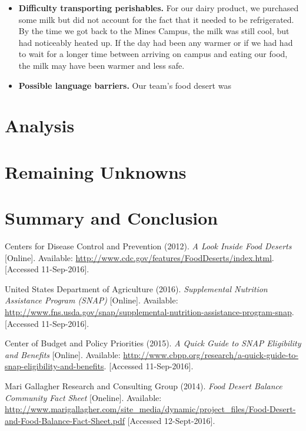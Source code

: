 \documentclass[11pt]{article}
\begin{document}
\begin{itemize}
    \item \textbf{Difficulty transporting perishables.} For our dairy product, we purchased some
        milk but did not account for the fact that it needed to be refrigerated. By the time we got
        back to the Mines Campus, the milk was still cool, but had noticeably heated up. If the day
        had been any warmer or if we had had to wait for a longer time between arriving on campus
        and eating our food, the milk may have been warmer and less safe.

    \item \textbf{Possible language barriers.} Our team's food desert was 

\end{itemize}

\section{Analysis}

\section{Remaining Unknowns}

\section{Summary and Conclusion}

\pagebreak
\begin{thebibliography}{9}
    Centers for Disease Control and Prevention (2012).
    \textit{A Look Inside Food Deserts} [Online].
    Available: \url{http://www.cdc.gov/features/FoodDeserts/index.html}.
    [Accessed 11-Sep-2016].

    United States Department of Agriculture (2016).
    \textit{Supplemental Nutrition Assistance Program (SNAP)} [Online].
    Available: \url{http://www.fns.usda.gov/snap/supplemental-nutrition-assistance-program-snap}.
    [Accessed 11-Sep-2016].

    Center of Budget and Policy Priorities (2015).
    \textit{A Quick Guide to SNAP Eligibility and Benefits} [Online].
    Available: \url{http://www.cbpp.org/research/a-quick-guide-to-snap-eligibility-and-benefits}.
    [Accessed 11-Sep-2016].

    Mari Gallagher Research and Consulting Group (2014).
    \textit{Food Desert Balance Community Fact Sheet} [Oneline].
    Available:
    \url{http://www.marigallagher.com/site_media/dynamic/project_files/Food-Desert-and-Food-Balance-Fact-Sheet.pdf}
    [Accessed 12-Sept-2016].

\end{thebibliography}
\end{document}
